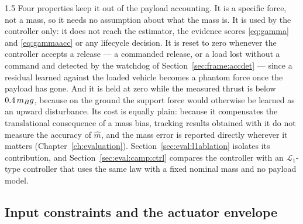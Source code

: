 \begin{spacing}{1.5}
Four properties keep it out of the payload accounting. It is a specific force,
not a mass, so it needs no assumption about what the mass is. It is used by the
controller only: it does not reach the estimator, the evidence scores
\eqref{eq:gamma} and \eqref{eq:gammaacc} or any lifecycle decision. It is reset
to zero whenever the controller accepts a release --- a commanded release, or a
load lost without a command and detected by the watchdog of
Section~\ref{sec:frame:accdet} --- since a residual learned against the loaded
vehicle becomes a phantom force once the payload has gone. And it is held at zero while the measured thrust is below
$0.4\,m_B g$, because on the ground the support force would otherwise be learned
as an upward disturbance. Its cost is equally plain: because it compensates the
translational consequence of a mass bias, tracking results obtained with it do
not measure the accuracy of $\hat m$, and the mass error is reported directly
wherever it matters (Chapter~\ref{ch:evaluation}).
Section~\ref{sec:eval:l1ablation} isolates its contribution, and
Section~\ref{sec:eval:camp:ctrl} compares the controller with an
$\mathcal{L}_1$-type controller that uses the same law with a fixed nominal mass
and no payload model.

\subsection{Input constraints and the actuator envelope}\label{sec:frame:inputs}


\end{spacing}
